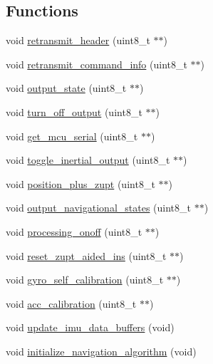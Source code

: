\subsection*{\-Functions}
\begin{DoxyCompactItemize}
\item 
void \hyperlink{group__tables_ga0c546b02615dc75cdf2385651cc823ce}{retransmit\-\_\-header} (uint8\-\_\-t $\ast$$\ast$)
\item 
void \hyperlink{group__tables_ga63c90fa711213e6746dc061226580e1a}{retransmit\-\_\-command\-\_\-info} (uint8\-\_\-t $\ast$$\ast$)
\item 
void \hyperlink{group__tables_ga154e99940eadddeab0a978ebaaf4af29}{output\-\_\-state} (uint8\-\_\-t $\ast$$\ast$)
\item 
void \hyperlink{group__tables_gaf49fcc59b85d00300cceac3381af50ac}{turn\-\_\-off\-\_\-output} (uint8\-\_\-t $\ast$$\ast$)
\item 
void \hyperlink{group__tables_ga144f167d203bfaa934388244862c2e66}{get\-\_\-mcu\-\_\-serial} (uint8\-\_\-t $\ast$$\ast$)
\item 
void \hyperlink{group__tables_ga18b9c076238f0421e0c613aba24c1e96}{toggle\-\_\-inertial\-\_\-output} (uint8\-\_\-t $\ast$$\ast$)
\item 
void \hyperlink{group__tables_gade63f6b7485456459a562107079a76a8}{position\-\_\-plus\-\_\-zupt} (uint8\-\_\-t $\ast$$\ast$)
\item 
void \hyperlink{group__tables_ga73d5a4fdd7dbdf0707007e03b69dd7aa}{output\-\_\-navigational\-\_\-states} (uint8\-\_\-t $\ast$$\ast$)
\item 
void \hyperlink{group__tables_ga2f8eeda3ee360ccf29e05fbfda016f47}{processing\-\_\-onoff} (uint8\-\_\-t $\ast$$\ast$)
\item 
void \hyperlink{group__tables_gae59981ff1a5486c063329824f812d6ef}{reset\-\_\-zupt\-\_\-aided\-\_\-ins} (uint8\-\_\-t $\ast$$\ast$)
\item 
void \hyperlink{group__tables_ga208e711393802848a2f84f913ef3cb84}{gyro\-\_\-self\-\_\-calibration} (uint8\-\_\-t $\ast$$\ast$)
\item 
void \hyperlink{group__tables_ga29fdeaec38ab911e7c4a5ffd19dc178d}{acc\-\_\-calibration} (uint8\-\_\-t $\ast$$\ast$)
\item 
void \hyperlink{group__tables_gaae1bbd924940610e1709300d40ca5a0f}{update\-\_\-imu\-\_\-data\-\_\-buffers} (void)
\item 
void \hyperlink{group__tables_ga8b0f8dc8c2ae1ff3f5e4f27284cf8e77}{initialize\-\_\-navigation\-\_\-algorithm} (void)

\end{DoxyCompactItemize}
